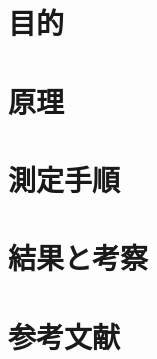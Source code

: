 \documentclass[11pt,a4j]{jsarticle}
\title{}
\author{1413176 三村幸祐}
\date{ \, }
\begin{document}
  
  
 \section{目的}
  
  
  
 \section{原理}
  
  
  
 \section{測定手順}
  
  
  
 \section{結果と考察}
  
  
  
 \section{参考文献}
  
  
  
\end{document}
